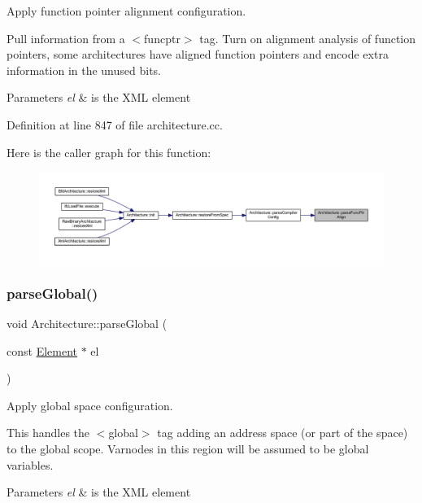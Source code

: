 Apply function pointer alignment configuration. 

Pull information from a $<$funcptr$>$ tag. Turn on alignment analysis of function pointers, some architectures have aligned function pointers and encode extra information in the unused bits. 
\begin{DoxyParams}{Parameters}
{\em el} & is the X\+ML element \\
\hline
\end{DoxyParams}


Definition at line 847 of file architecture.\+cc.

Here is the caller graph for this function\+:
\nopagebreak
\begin{figure}[H]
\begin{center}
\leavevmode
\includegraphics[width=350pt]{class_architecture_a5e10589073ea41018047b8affb10025e_icgraph}
\end{center}
\end{figure}
\mbox{\label{class_architecture_a6348f797097deb07776eca437458ecc8}} 
\subsubsection{\texorpdfstring{parseGlobal()}{parseGlobal()}}
{\footnotesize\ttfamily void Architecture\+::parse\+Global (\begin{DoxyParamCaption}\item[{const \mbox{\hyperlink{class_element}{Element}} $\ast$}]{el }\end{DoxyParamCaption})\hspace{0.3cm}{\ttfamily [protected]}}



Apply global space configuration. 

This handles the $<$global$>$ tag adding an address space (or part of the space) to the global scope. Varnodes in this region will be assumed to be global variables. 
\begin{DoxyParams}{Parameters}
{\em el} & is the X\+ML element \\
\hline
\end{DoxyParams}


